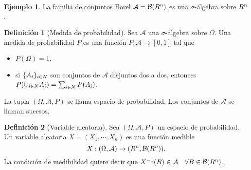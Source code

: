 \documentclass[10pt,a4paper]{article} %
\let\mathbb\relax
\theoremstyle{definition}
\newtheorem{definition}{Definición}[section]
\newtheorem{example}[theorem]{Ejemplo}
\begin{document}
\begin{example}
  La familia de conjuntos Borel $\mathcal{A} = \mathcal{B}(\mathbb{R}^n)$ es una $\sigma$-álgebra sobre $\mathbb{R}^n$.
\end{example}

\begin{definition}[Medida de probabilidad]
  Sea $\mathcal{A}$ una $\sigma$-álgebra sobre $\Omega$. Una medida de probabilidad $P$ es una función $P:\mathcal{A} \to [0,1]$ tal que
  \begin{itemize}
  \item $P(\Omega) = 1$,
   \item si  $\{A_i\}_{i\in \mathbb{N}}$ son conjuntos de $\mathcal{A}$ disjuntos dos a dos, entonces $P(\cup_{i\in \mathbb{N}}A_i) = \sum_{i\in\mathbb{N}}P(A_i)$. 
  \end{itemize}
\end{definition}

La tupla $(\Omega, \mathcal{A}, P)$ se llama espacio de probabilidad. Los conjuntos de $\mathcal{A}$ se llaman sucesos.\\%



\begin{definition}[Variable aleatoria]
    Sea $(\Omega, \mathcal{A}, P)$ un espacio de probabilidad. Un variable aleatoria $X=(X_1,\cdots, X_n)$ es una función medible \[
X:(\Omega, \mathcal{A}) \to (\mathbb{R}^n, \mathcal{B}(\mathbb{R}^n)).
\]
La condición de medibilidad quiere decir que $X^{-1}(B) \in \mathcal{A}\quad \forall B\in \mathcal{B}(\mathbb{R}^n)$.
\end{definition}
\end{document}
